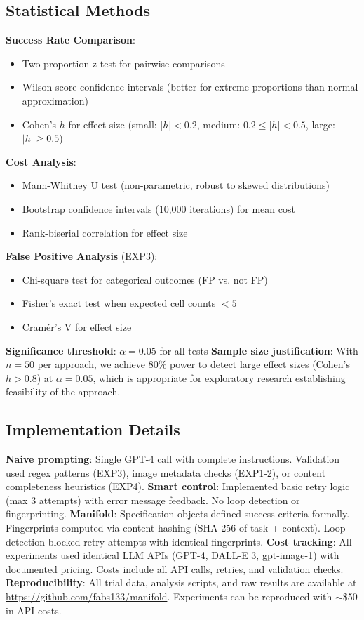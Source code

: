 \documentclass{article}
\begin{document}
\subsection{Statistical Methods}
\textbf{Success Rate Comparison}:
\begin{itemize}
\item Two-proportion z-test for pairwise comparisons
\item Wilson score confidence intervals \citep{wilson1927probable} (better for extreme proportions than normal approximation)
\item Cohen's $h$ for effect size \citep{cohen1988statistical} (small: $|h| < 0.2$, medium: $0.2 \leq |h| < 0.5$, large: $|h| \geq 0.5$)
\end{itemize}
\textbf{Cost Analysis}:
\begin{itemize}
\item Mann-Whitney U test \citep{mann1947test} (non-parametric, robust to skewed distributions)
\item Bootstrap confidence intervals \citep{efron1979bootstrap} (10,000 iterations) for mean cost
\item Rank-biserial correlation for effect size
\end{itemize}
\textbf{False Positive Analysis} (EXP3):
\begin{itemize}
\item Chi-square test for categorical outcomes (FP vs. not FP)
\item Fisher's exact test when expected cell counts $< 5$
\item Cram\'{e}r's V for effect size
\end{itemize}
\textbf{Significance threshold}: $\alpha = 0.05$ for all tests
\textbf{Sample size justification}: With $n=50$ per approach, we achieve 80\% power to detect large effect sizes (Cohen's $h > 0.8$) at $\alpha = 0.05$, which is appropriate for exploratory research establishing feasibility of the approach.

\subsection{Implementation Details}
\textbf{Naive prompting}: Single GPT-4 call with complete instructions. Validation used regex patterns (EXP3), image metadata checks (EXP1-2), or content completeness heuristics (EXP4).
\textbf{Smart control}: Implemented basic retry logic (max 3 attempts) with error message feedback. No loop detection or fingerprinting.
\textbf{Manifold}: Specification objects defined success criteria formally. Fingerprints computed via content hashing (SHA-256 of task + context). Loop detection blocked retry attempts with identical fingerprints.
\textbf{Cost tracking}: All experiments used identical LLM APIs (GPT-4, DALL-E 3, gpt-image-1) with documented pricing. Costs include all API calls, retries, and validation checks.
\textbf{Reproducibility}: All trial data, analysis scripts, and raw results are available at \url{https://github.com/fabs133/manifold}. Experiments can be reproduced with $\sim$\$50 in API costs.
\end{document}
